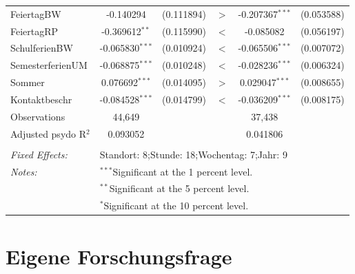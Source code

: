 \documentclass[a4paper,12pt]{thesis}
\begin{document}
\begin{table}[!htbp]
\begin{tabular}{@{\extracolsep{-5pt}}lccccc}
		FeiertagBW & -0.140294 & (0.111894) & $>$ & -0.207367$^{***}$ & (0.053588)\\ 
		
		FeiertagRP & -0.369612$^{**}$ & (0.115990) & $<$ & -0.085082 & (0.056197)\\ 
		
		SchulferienBW & -0.065830$^{***}$ & (0.010924) & $<$ & -0.065506$^{***}$ & (0.007072)\\ 
		
		SemesterferienUM & -0.068875$^{***}$ & (0.010248) & $<$ & -0.028236$^{***}$ & (0.006324)\\ 
		
		Sommer & 0.076692$^{***}$ & (0.014095) & $>$ & 0.029047$^{***}$ & (0.008655)\\ 
		
		Kontaktbeschr & -0.084528$^{***}$ & (0.014799) & $<$ & -0.036209$^{***}$ & (0.008175)\\ 
		
		Observations & 44,649 & & & 37,438 & \\ 
		Adjusted psydo R$^{2}$ & 0.093052 & & & 0.041806 & \\  
		\hline \\[-1.8ex] 
		\textit{Fixed Effects:} & \multicolumn{5}{l}{Standort: 8;Stunde: 18;Wochentag: 7;Jahr: 9} \\ 
		\textit{Notes:} & \multicolumn{5}{l}{$^{***}$Significant at the 1 percent level.} \\ 
		& \multicolumn{5}{l}{$^{**}$Significant at the 5 percent level.} \\ 
		& \multicolumn{5}{l}{$^{*}$Significant at the 10 percent level.} \\ 
	\end{tabular} 
\end{table} 


\chapter{Eigene Forschungsfrage}
\end{document}
